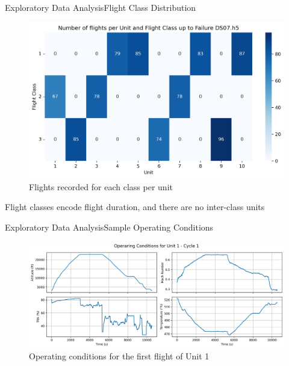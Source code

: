 \documentclass{beamer}
\begin{document}
        \begin{frame}{Exploratory Data Analysis}{Flight Class Distribution}
            \begin{figure}[!htbp]
                \centering
                \includegraphics[scale=0.4]{fligt_class_per_unit_DS07.h5.png}
                \caption{Flights recorded for each class per unit}
            \end{figure}
            Flight classes encode flight duration\footnotemark[1], and there are no inter-class units
        \end{frame}

        \begin{frame}{Exploratory Data Analysis}{Sample Operating Conditions}
            \begin{figure}[!htbp]
                \centering
                \includegraphics[scale=0.35]{operating_conditions_unit_1_cycle_1.png}
                \caption{Operating conditions for the first flight of Unit 1}
            \end{figure}
        \end{frame}
\end{document}
